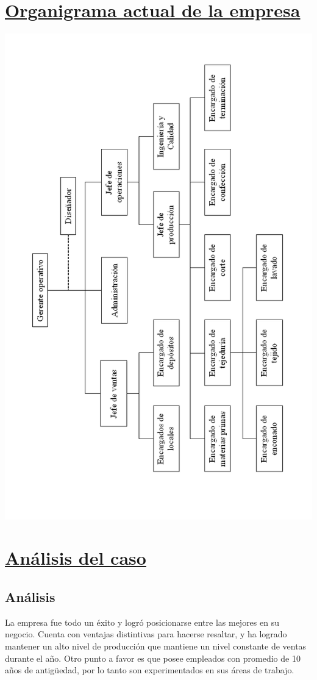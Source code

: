 \documentclass[a4paper,12pt,titlepage]{article}
\begin{document}
\newpage
\section{\underline{Organigrama actual de la empresa}}
	\begin{center}
	\includegraphics[width=450pt]{./DollyOrnigrama.png}
	\end{center}



\newpage
\section{\underline{An\'{a}lisis del caso}}
	\subsection{An\'{a}lisis}
	La empresa fue todo un \'exito y logr\'o posicionarse entre las mejores en su negocio. Cuenta con ventajas distintivas para hacerse resaltar, y ha logrado mantener un alto nivel de producci\'on que mantiene un nivel constante de ventas durante el a\~no. Otro punto a favor es que posee empleados con promedio de 10 a\~nos de antig\"uedad, por lo tanto son experimentados en sus \'areas de trabajo.\\
		
\end{document}
